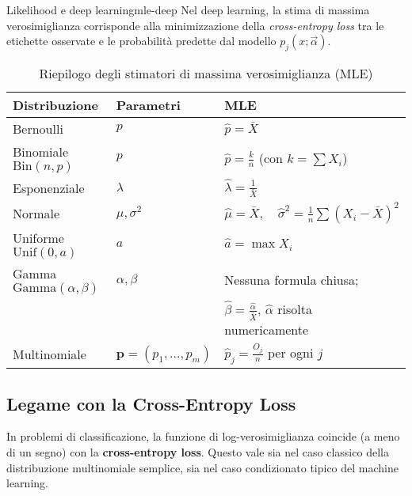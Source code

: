 \begin{nota}{Likelihood e deep learning}{mle-deep}
Nel deep learning, la stima di massima verosimiglianza corrisponde alla minimizzazione della \emph{cross-entropy loss} tra le etichette osservate e le probabilità predette dal modello \( p_j(x; \vec{\alpha}) \).
\end{nota}

\begin{table}[htbp]
\centering
\caption{Riepilogo degli stimatori di massima verosimiglianza (MLE)}
\label{tab:mle-riepilogo}
\renewcommand{\arraystretch}{1.3}
\begin{tabular}{@{}lll@{}}
\toprule
\textbf{Distribuzione} & \textbf{Parametri} & \textbf{MLE} \\
\midrule
Bernoulli & \( p \) & \( \hat{p} = \bar{X} \) \\
Binomiale \( \mathrm{Bin}(n, p) \) & \( p \) & \( \hat{p} = \frac{k}{n} \) (con \( k = \sum X_i \)) \\
Esponenziale & \( \lambda \) & \( \hat{\lambda} = \frac{1}{\bar{X}} \) \\
Normale & \( \mu, \sigma^2 \) & \( \hat{\mu} = \bar{X}, \quad \hat{\sigma}^2 = \frac{1}{n} \sum (X_i - \bar{X})^2 \) \\
Uniforme \( \mathrm{Unif}(0, a) \) & \( a \) & \( \hat{a} = \max X_i \) \\
Gamma \( \mathrm{Gamma}(\alpha, \beta) \) & \( \alpha, \beta \) & Nessuna formula chiusa; \\
 & & \( \hat{\beta} = \frac{\hat{\alpha}}{\bar{X}} \), \quad \(\hat{\alpha}\) risolta numericamente \\
Multinomiale & \( \boldsymbol{p} = (p_1, \dots, p_m) \) & \( \hat{p}_j = \frac{O_j}{n} \) per ogni \( j \) \\
\bottomrule
\end{tabular}
\end{table}


\subsection{Legame con la Cross-Entropy Loss}\label{subsec:cross-entropy}
In problemi di classificazione, la funzione di log-verosimiglianza coincide (a meno di un segno) con la \textbf{cross-entropy loss}. Questo vale sia nel caso classico della distribuzione multinomiale semplice, sia nel caso condizionato tipico del machine learning.


